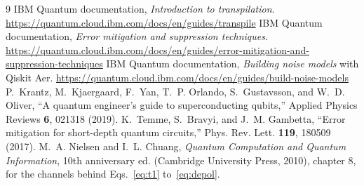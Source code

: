 \documentclass[11pt]{article}
\begin{document}
\begin{thebibliography}{9}
 IBM Quantum documentation, \emph{Introduction to transpilation}. \url{https://quantum.cloud.ibm.com/docs/en/guides/transpile}
 IBM Quantum documentation, \emph{Error mitigation and suppression techniques}. \url{https://quantum.cloud.ibm.com/docs/en/guides/error-mitigation-and-suppression-techniques}
 IBM Quantum documentation, \emph{Building noise models} with Qiskit Aer. \url{https://quantum.cloud.ibm.com/docs/en/guides/build-noise-models}
 P.~Krantz, M.~Kjaergaard, F.~Yan, T.~P. Orlando, S.~Gustavsson, and W.~D. Oliver, ``A quantum engineer's guide to superconducting qubits,'' Applied Physics Reviews \textbf{6}, 021318 (2019).
 K.~Temme, S.~Bravyi, and J.~M. Gambetta, ``Error mitigation for short-depth quantum circuits,'' Phys. Rev. Lett. \textbf{119}, 180509 (2017).
 M.~A. Nielsen and I.~L. Chuang, \emph{Quantum Computation and Quantum Information}, 10th anniversary ed. (Cambridge University Press, 2010), chapter 8, for the channels behind Eqs.~\eqref{eq:t1} to~\eqref{eq:depol}.
\end{thebibliography}
\end{document}
